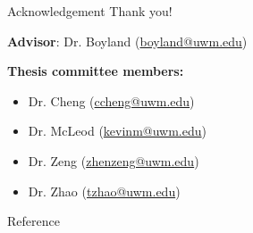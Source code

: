 \begin{frame}{Acknowledgement}{}
    {\huge \alert{Thank you!}}
    
    \emptyline
    
    \emptyline
    
    \textbf{Advisor}: Dr. Boyland (\url{boyland@uwm.edu})
    
    \emptyline
    
    \textbf{Thesis committee members:}
        \begin{itemize}
            \item Dr. Cheng (\url{ccheng@uwm.edu})
            \item Dr. McLeod (\url{kevinm@uwm.edu})
            \item Dr. Zeng (\url{zhenzeng@uwm.edu})
            \item Dr. Zhao (\url{tzhao@uwm.edu})
        \end{itemize}
    
\end{frame}


\begin{frame}{Reference}{}
{\tiny \fontsize{1.5}{4}\selectfont

{}
}
\end{frame}